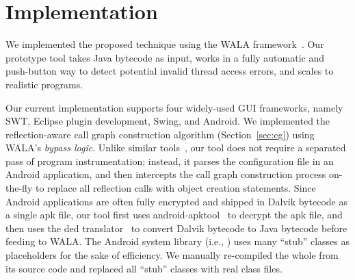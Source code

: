 \section{Implementation}
\label{sec:implementation}

We implemented the proposed technique using the WALA framework~\cite{walatutorial}.
Our prototype tool takes Java bytecode as input, works in a fully
automatic and push-button way to detect potential invalid thread access
errors, and scales to realistic programs.  


Our current implementation supports four widely-used GUI frameworks, namely
SWT, Eclipse plugin development, Swing, and Android.
We implemented the reflection-aware call graph construction
 algorithm (Section~\ref{sec:cg}) using WALA's \textit{bypass logic}.
Unlike similar tools~\cite{Payet:2011:SAA:2032266.2032299}, our tool
does not require a separated
pass of program instrumentation; instead, it
parses the configuration file in an Android application,
and then intercepts the call graph construction
process on-the-fly to replace all reflection calls with object creation statements.
Since Android applications are often fully encrypted and shipped in Dalvik
bytecode as a single apk file, our tool first uses
android-apktool~\cite{apktool} to
decrypt the apk file, and then uses the 
ded translator~\cite{Enck:2011:SAA:2028067.2028088} to convert
Dalvik bytecode to Java bytecode before feeding to WALA.  The Android system
library (i.e., ) uses many ``stub'' classes as
placeholders for the sake of efficiency. We manually re-compiled the whole
 from its source code and replaced all ``stub'' classes
with real class files.



